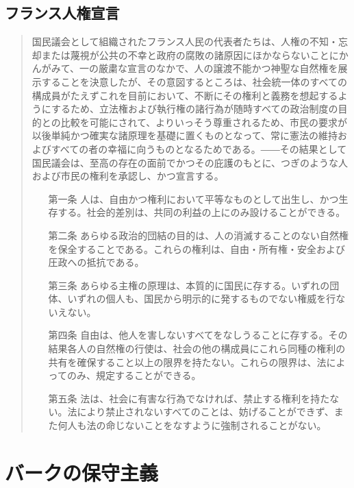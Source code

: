 \documentclass[uplatex,dvipdfmx]{jsarticle} \usepackage{mystyle}%
\begin{document}
\subsection*{フランス人権宣言}
\label{french}
\begin{quote}\footnotesize{}
  国民議会として組織されたフランス人民の代表者たちは、人権の不知・忘却または蔑視が公共の不幸と政府の腐敗の諸原因にほかならないことにかんがみて、一の厳粛な宣言のなかで、人の譲渡不能かつ神聖な自然権を展示することを決意したが、その意図するところは、社会統一体のすべての構成員がたえずこれを目前において、不断にその権利と義務を想起するようにするため、立法権および執行権の諸行為が随時すべての政治制度の目的との比較を可能にされて、よりいっそう尊重されるため、市民の要求が以後単純かつ確実な諸原理を基礎に置くものとなって、常に憲法の維持およびすべての者の幸福に向うものとなるためである。――その結果として国民議会は、至高の存在の面前でかつその庇護のもとに、つぎのような人および市民の権利を承認し、かつ宣言する。

  \begin{enumerate}



  \item[第一条] 人は、自由かつ権利において平等なものとして出生し、かつ生存する。社会的差別は、共同の利益の上にのみ設けることができる。

  \item[第二条] あらゆる政治的団結の目的は、人の消滅することのない自然権を保全することである。これらの権利は、自由・所有権・安全および圧政への抵抗である。

  \item[第三条] あらゆる主権の原理は、本質的に国民に存する。いずれの団体、いずれの個人も、国民から明示的に発するものでない権威を行ないえない。

  \item[第四条]自由は、他人を害しないすべてをなしうることに存する。その結果各人の自然権の行使は、社会の他の構成員にこれら同種の権利の共有を確保すること以上の限界を持たない。これらの限界は、法によってのみ、規定することができる。
 
  \item[第五条]法は、社会に有害な行為でなければ、禁止する権利を持たない。法により禁止されないすべてのことは、妨げることができず、また何人も法の命じないことをなすように強制されることがない。

  \end{enumerate}
\end{quote}


\section{バークの保守主義}
\end{document}
